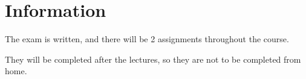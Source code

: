 \section{Information}
\begin{flushleft}
The exam is written, and there will be 2 assignments throughout the course.

They will be completed after the lectures, so they are not to be completed from home.
\end{flushleft}
